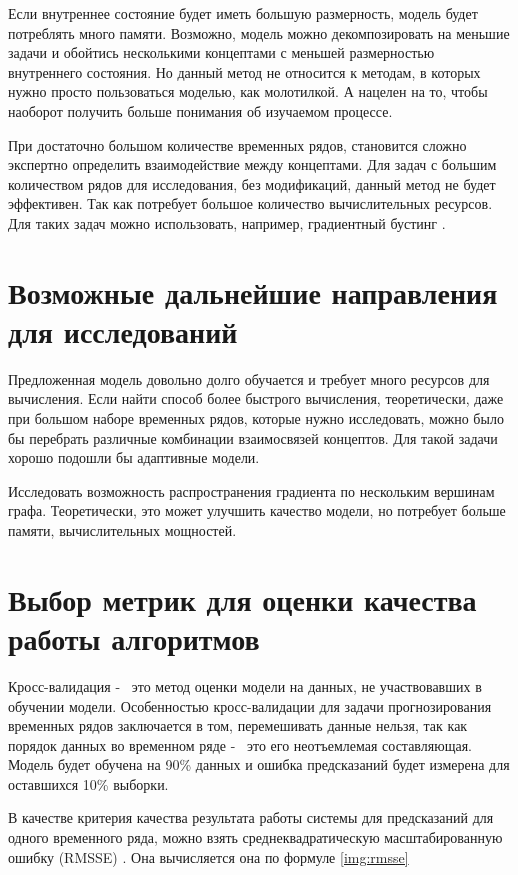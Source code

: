 Если внутреннее состояние будет иметь большую размерность,
модель будет потреблять много памяти. Возможно, модель можно
декомпозировать на меньшие задачи и обойтись несколькими концептами
с меньшей размерностью внутреннего состояния.
Но данный метод не относится к методам, в которых нужно просто
пользоваться моделью, как молотилкой. А нацелен на то, чтобы наоборот
получить больше понимания об изучаемом процессе.

При достаточно большом количестве временных рядов,
становится сложно экспертно определить взаимодействие между концептами.
Для задач с большим количеством рядов для исследования, без
модификаций, данный метод не будет эффективен. Так как потребует
большое количество вычислительных ресурсов.
Для таких задач можно использовать, например, градиентный бустинг \cite{friedman2002stochastic}.

\section{Возможные дальнейшие направления для исследований}

Предложенная модель довольно долго обучается и требует много ресурсов
для вычисления. Если найти способ более быстрого вычисления,
теоретически, даже при большом наборе временных рядов, которые нужно
исследовать, можно было бы перебрать различные комбинации взаимосвязей концептов.
Для такой задачи хорошо подошли бы адаптивные модели.

Исследовать возможность распространения градиента по нескольким вершинам
графа. Теоретически, это может улучшить качество модели, но потребует больше
памяти, вычислительных мощностей.

\section{Выбор метрик для оценки качества работы алгоритмов}

Кросс-валидация -~ это метод оценки модели на данных, не участвовавших
в обучении модели. Особенностью кросс-валидации для задачи прогнозирования
временных рядов заключается в том, перемешивать данные нельзя,
так как порядок данных во временном ряде -~ это его неотъемлемая составляющая.
Модель будет обучена на 90\% данных и ошибка предсказаний будет измерена
для оставшихся 10\% выборки.

В качестве критерия качества результата работы системы для предсказаний
для одного временного ряда, можно взять среднеквадратическую
масштабированную ошибку (RMSSE) \cite{hyndman2006another}.
Она вычисляется она по формуле \ref{img:rmsse}

